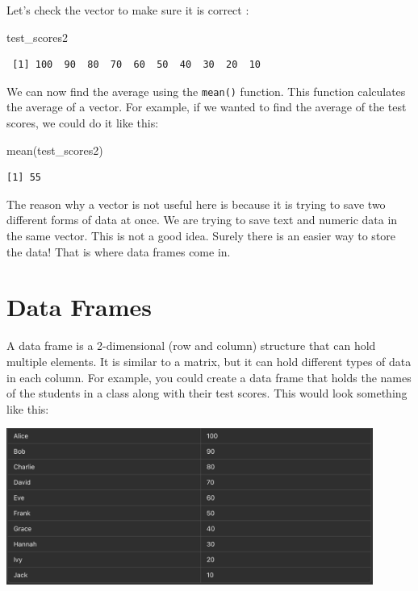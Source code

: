 \documentclass[
  letterpaper,
  DIV=11,
  numbers=noendperiod]{scrreprt}
\newenvironment{Shaded}{\begin{snugshade}}{\end{snugshade}}
\newcommand{\FunctionTok}[1]{\textcolor[rgb]{0.28,0.35,0.67}{#1}}
\newcommand{\NormalTok}[1]{\textcolor[rgb]{0.00,0.23,0.31}{#1}}
\begin{document}
Let's check the vector to make sure it is correct :

\begin{Shaded}
\begin{Highlighting}[]
\NormalTok{test\_scores2}
\end{Highlighting}
\end{Shaded}

\begin{verbatim}
 [1] 100  90  80  70  60  50  40  30  20  10
\end{verbatim}

We can now find the average using the \texttt{mean()} function. This
function calculates the average of a vector. For example, if we wanted
to find the average of the test scores, we could do it like this:

\begin{Shaded}
\begin{Highlighting}[]
\FunctionTok{mean}\NormalTok{(test\_scores2)}
\end{Highlighting}
\end{Shaded}

\begin{verbatim}
[1] 55
\end{verbatim}

The reason why a vector is not useful here is because it is trying to
save two different forms of data at once. We are trying to save text and
numeric data in the same vector. This is not a good idea. Surely there
is an easier way to store the data! That is where data frames come in.

\section*{Data Frames}\label{data-frames}


A data frame is a 2-dimensional (row and column) structure that can hold
multiple elements. It is similar to a matrix, but it can hold different
types of data in each column. For example, you could create a data frame
that holds the names of the students in a class along with their test
scores. This would look something like this:

\includegraphics[width=0.9\textwidth,height=\textheight]{./images/Vector-2.jpg}
\end{document}
